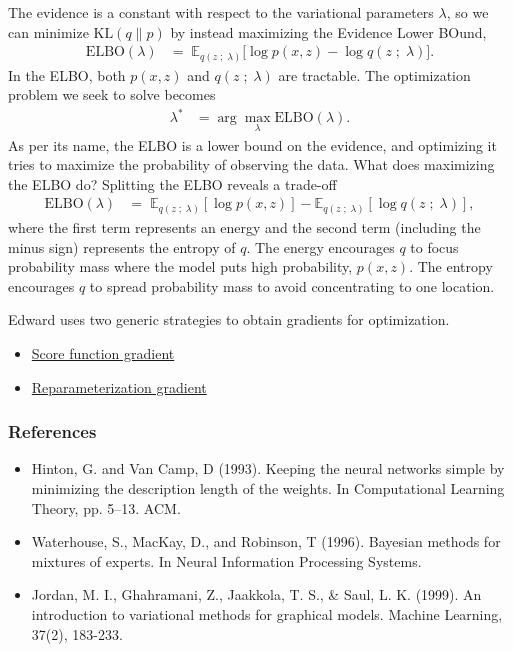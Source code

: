 The evidence is a constant with respect to the variational parameters $\lambda$,
so we can minimize $\text{KL}(q\|p)$ by instead maximizing
the Evidence Lower BOund,
\begin{align*}
  \text{ELBO}(\lambda)
  &=\;
  \mathbb{E}_{q(z\;;\;\lambda)}
  \big[
  \log p(x, z)
  -
  \log q(z\;;\;\lambda)
  \big].
\end{align*}
In the ELBO, both $p(x,z)$ and $q(z\;;\;\lambda)$ are
tractable. The optimization problem we seek to solve becomes
\begin{align*}
  \lambda^*
  &=
  \arg \max_\lambda \text{ELBO}(\lambda).
\end{align*}
As per its name, the ELBO is a lower bound on the evidence, and
optimizing it tries to maximize the probability of observing the data.
What does maximizing the ELBO do? Splitting the ELBO reveals a trade-off
\begin{align*}
  \text{ELBO}(\lambda)
  &=\;
  \mathbb{E}_{q(z \;;\; \lambda)}[\log p(x, z)]
  - \mathbb{E}_{q(z \;;\; \lambda)}[\log q(z\;;\;\lambda)],
\end{align*}
where the first term represents an energy and the second term
(including the minus sign) represents the entropy of $q$.
The energy encourages $q$ to focus probability mass where the
model puts high probability, $p(x, z)$.
The entropy encourages $q$ to spread probability mass to avoid
concentrating to one location.

Edward uses two generic strategies to obtain gradients for
optimization.
\begin{itemize}
    \item \href{tut_KLqp_score.html}{Score function gradient}
    \item \href{tut_KLqp_reparam.html}{Reparameterization gradient}
  \end{itemize}

\subsubsection{References}\label{references}

\begin{itemize}
\item
  Hinton, G. and Van Camp, D (1993). Keeping the neural networks
  simple by minimizing the description length of the weights. In
  Computational Learning Theory, pp. 5–13. ACM.
\item
  Waterhouse, S., MacKay, D., and Robinson, T (1996). Bayesian methods
  for mixtures of experts. In Neural Information Processing Systems.
\item
  Jordan, M. I., Ghahramani, Z., Jaakkola, T. S., & Saul, L. K.
  (1999). An introduction to variational methods for graphical models.
  Machine Learning, 37(2), 183-233.
\end{itemize}
